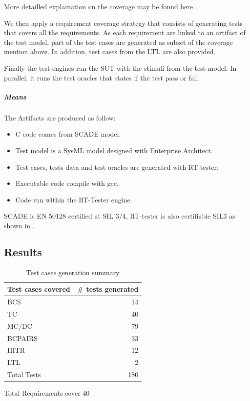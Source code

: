 More detailled explaination on the coverage may be found here \cite{huang_test_2013}.

We then apply a requirement coverage strategy that consists of
generating tests that covers all the requirements. As each requirement
are linked to an artifact of the test model, part of the test cases
are generated as subset of the coverage mention above. In addition,
test cases from the LTL are also provided.


Finally the test engines run the SUT with the stimuli from the test
model. In parallel, it runs the test oracles that states if the test
pass or fail.

\subparagraph{Means}

The Artifacts are produced as follow:
\begin{itemize}
\item C code comes from SCADE model.
\item Test model is a SysML model designed with Enterprise Architect.
\item Test cases, tests data and test oracles are generated with RT-tester.
\item Executable code compile with gcc.
\item Code run within the RT-Tester engine.
\end{itemize}

SCADE is EN 50128 certified at SIL 3/4, RT-tester is also certifiable
SIL3 as shown in \cite{peleska_efficient_2012}.

\subsection{Results}

\begin{table}[htbp]
\centering
\begin{tabular}{lr}\toprule
  Test cases covered & \# tests generated  \\\midrule
  BCS & 14 \\
  TC & 40 \\
  MC/DC & 79 \\
  BCPAIRS & 33\\
  HITR & 12 \\
  LTL & 2 \\ \midrule
  Total Tests& 180\\\bottomrule
\end{tabular}

\vspace{1em}
\raggedleft Total Requirements cover 40
\caption{\label{tbl:test_summary} Test cases generation summary}
\end{table}

